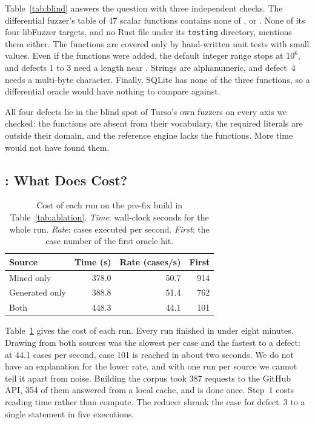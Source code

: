 Table~\ref{tab:blind} answers the question with three independent checks. The
differential fuzzer's table of 47 scalar functions contains none of
,  or . None of its four libFuzzer targets, and
no Rust file under its \texttt{testing} directory, mentions them either. The
functions are covered only by hand-written unit tests with small values. Even if
the functions were added, the default integer range stops at $10^6$, and defects
1 to 3 need a length near \imax. Strings are alphanumeric, and defect~4 needs a
multi-byte character. Finally, SQLite has none of the three functions, so a
differential oracle would have nothing to compare against.

\begin{observation}
\label{obs:blind}
All four defects lie in the blind spot of Turso's own fuzzers on every axis we
checked: the functions are absent from their vocabulary, the required literals
are outside their domain, and the reference engine lacks the functions. More time
would not have found them.
\end{observation}

\subsection{: What Does \tool Cost?}
\label{sec:rq4}

\begin{table}[t]
  \caption{Cost of each run on the pre-fix build in Table~\ref{tab:ablation}.
  \emph{Time}: wall-clock seconds for the whole run. \emph{Rate}: cases executed
  per second. \emph{First}: the case number of the first oracle hit.}
  \label{tab:cost}
  \footnotesize
  \begin{tabular}{@{}lrrr@{}}
    \toprule
    Source & Time (s) & Rate (cases/s) & First \\
    \midrule
    Mined only     & 378.0 & 50.7 & 914 \\
    Generated only & 388.8 & 51.4 & 762 \\
    Both           & 448.3 & 44.1 & 101 \\
    \bottomrule
  \end{tabular}
\end{table}

Table~\ref{tab:cost} gives the cost of each run. Every run finished in under eight
minutes. Drawing from both sources was the slowest per case and the fastest to a
defect: at 44.1 cases per second, case 101 is reached in about two seconds. We do
not have an explanation for the lower rate, and with one run per source we cannot
tell it apart from noise. Building the corpus took 387 requests to the GitHub API,
354 of them answered from a local cache, and is done once. Step~1 costs reading
time rather than compute. The reducer shrank the case for defect~3 to a single
statement in five executions.

